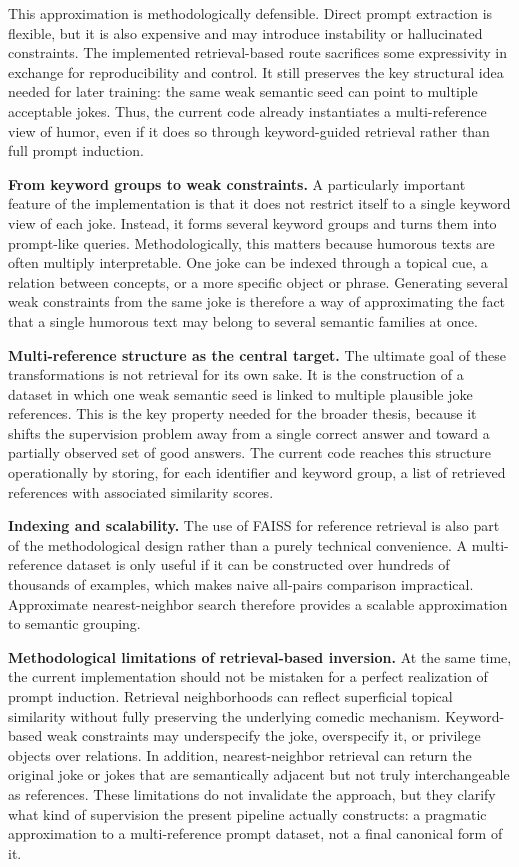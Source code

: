 \documentclass[11pt]{article}
\begin{document}
This approximation is methodologically defensible. Direct prompt extraction is flexible, but it is also expensive and may introduce instability or hallucinated constraints. The implemented retrieval-based route sacrifices some expressivity in exchange for reproducibility and control. It still preserves the key structural idea needed for later training: the same weak semantic seed can point to multiple acceptable jokes. Thus, the current code already instantiates a multi-reference view of humor, even if it does so through keyword-guided retrieval rather than full prompt induction.

\textbf{From keyword groups to weak constraints.} A particularly important feature of the implementation is that it does not restrict itself to a single keyword view of each joke. Instead, it forms several keyword groups and turns them into prompt-like queries. Methodologically, this matters because humorous texts are often multiply interpretable. One joke can be indexed through a topical cue, a relation between concepts, or a more specific object or phrase. Generating several weak constraints from the same joke is therefore a way of approximating the fact that a single humorous text may belong to several semantic families at once.

\textbf{Multi-reference structure as the central target.} The ultimate goal of these transformations is not retrieval for its own sake. It is the construction of a dataset in which one weak semantic seed is linked to multiple plausible joke references. This is the key property needed for the broader thesis, because it shifts the supervision problem away from a single correct answer and toward a partially observed set of good answers. The current code reaches this structure operationally by storing, for each identifier and keyword group, a list of retrieved references with associated similarity scores.

\textbf{Indexing and scalability.} The use of FAISS for reference retrieval is also part of the methodological design rather than a purely technical convenience. A multi-reference dataset is only useful if it can be constructed over hundreds of thousands of examples, which makes naive all-pairs comparison impractical. Approximate nearest-neighbor search therefore provides a scalable approximation to semantic grouping.

\textbf{Methodological limitations of retrieval-based inversion.} At the same time, the current implementation should not be mistaken for a perfect realization of prompt induction. Retrieval neighborhoods can reflect superficial topical similarity without fully preserving the underlying comedic mechanism. Keyword-based weak constraints may underspecify the joke, overspecify it, or privilege objects over relations. In addition, nearest-neighbor retrieval can return the original joke or jokes that are semantically adjacent but not truly interchangeable as references. These limitations do not invalidate the approach, but they clarify what kind of supervision the present pipeline actually constructs: a pragmatic approximation to a multi-reference prompt dataset, not a final canonical form of it.
\end{document}
